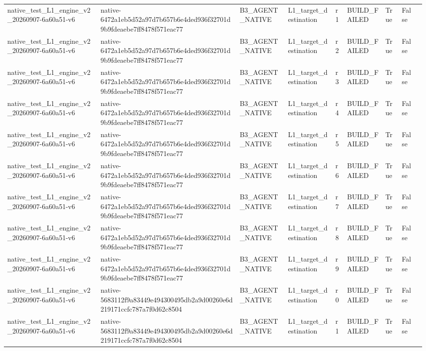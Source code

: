 \begin{tabular}{lllllllll}
native\_test\_L1\_engine\_v2\_20260907-6a60a51-v6 & native-6472a1eb5d52a97d7b657b6e4ded936f32701d9b9fdeaebe7ff8478f571eac77 & B3\_AGENT\_NATIVE & L1\_target\_destination & r1 & BUILD\_FAILED & True & False &  \\
native\_test\_L1\_engine\_v2\_20260907-6a60a51-v6 & native-6472a1eb5d52a97d7b657b6e4ded936f32701d9b9fdeaebe7ff8478f571eac77 & B3\_AGENT\_NATIVE & L1\_target\_destination & r2 & BUILD\_FAILED & True & False &  \\
native\_test\_L1\_engine\_v2\_20260907-6a60a51-v6 & native-6472a1eb5d52a97d7b657b6e4ded936f32701d9b9fdeaebe7ff8478f571eac77 & B3\_AGENT\_NATIVE & L1\_target\_destination & r3 & BUILD\_FAILED & True & False &  \\
native\_test\_L1\_engine\_v2\_20260907-6a60a51-v6 & native-6472a1eb5d52a97d7b657b6e4ded936f32701d9b9fdeaebe7ff8478f571eac77 & B3\_AGENT\_NATIVE & L1\_target\_destination & r4 & BUILD\_FAILED & True & False &  \\
native\_test\_L1\_engine\_v2\_20260907-6a60a51-v6 & native-6472a1eb5d52a97d7b657b6e4ded936f32701d9b9fdeaebe7ff8478f571eac77 & B3\_AGENT\_NATIVE & L1\_target\_destination & r5 & BUILD\_FAILED & True & False &  \\
native\_test\_L1\_engine\_v2\_20260907-6a60a51-v6 & native-6472a1eb5d52a97d7b657b6e4ded936f32701d9b9fdeaebe7ff8478f571eac77 & B3\_AGENT\_NATIVE & L1\_target\_destination & r6 & BUILD\_FAILED & True & False &  \\
native\_test\_L1\_engine\_v2\_20260907-6a60a51-v6 & native-6472a1eb5d52a97d7b657b6e4ded936f32701d9b9fdeaebe7ff8478f571eac77 & B3\_AGENT\_NATIVE & L1\_target\_destination & r7 & BUILD\_FAILED & True & False &  \\
native\_test\_L1\_engine\_v2\_20260907-6a60a51-v6 & native-6472a1eb5d52a97d7b657b6e4ded936f32701d9b9fdeaebe7ff8478f571eac77 & B3\_AGENT\_NATIVE & L1\_target\_destination & r8 & BUILD\_FAILED & True & False &  \\
native\_test\_L1\_engine\_v2\_20260907-6a60a51-v6 & native-6472a1eb5d52a97d7b657b6e4ded936f32701d9b9fdeaebe7ff8478f571eac77 & B3\_AGENT\_NATIVE & L1\_target\_destination & r9 & BUILD\_FAILED & True & False &  \\
native\_test\_L1\_engine\_v2\_20260907-6a60a51-v6 & native-5683112f9a83449e494300495db2a9d00260e6d219171ccfc787a7f0d62c8504 & B3\_AGENT\_NATIVE & L1\_target\_destination & r0 & BUILD\_FAILED & True & False &  \\
native\_test\_L1\_engine\_v2\_20260907-6a60a51-v6 & native-5683112f9a83449e494300495db2a9d00260e6d219171ccfc787a7f0d62c8504 & B3\_AGENT\_NATIVE & L1\_target\_destination & r1 & BUILD\_FAILED & True & False &  \\

\end{tabular}
